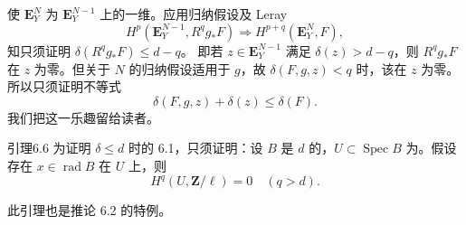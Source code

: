使 $\mathbf E_Y^N$ 为 $\mathbf E_Y^{N-1}$ 上的一维。应用归纳假设及 Leray 
\[H^p(\mathbf E_Y^{N-1},R^qg_*F)\Longrightarrow H^{p+q}(\mathbf E_Y^N,F),\]
知只须证明 $\delta(R^qg_*F)\le d-q$。
即若 $z\in\mathbf E_Y^{N-1}$ 满足 $\delta(z)>d-q$，则 $R^qg_*F$ 在 $z$ 为零。但关于 $N$ 的归纳假设适用于 $g$，故 $\delta(F,g,z)<q$ 时，该在 $z$ 为零。所以只须证明不等式
\[\delta(F,g,z)+\delta(z)\le\delta(F).\]
我们把这一乐趣留给读者。
\begin{SGAresult}{引理}{6.6}
为证明 $\delta\le d$ 时的 6.1，只须证明：设 $B$ 是 $d$ 的，$U\subset\operatorname{Spec}B$ 为。假设存在 $x\in\operatorname{rad}B$ 在 $U$ 上，则
\[H^q(U,\mathbf Z/\ell)=0\quad(q>d).\]
\end{SGAresult}
此引理也是推论 6.2 的特例。
